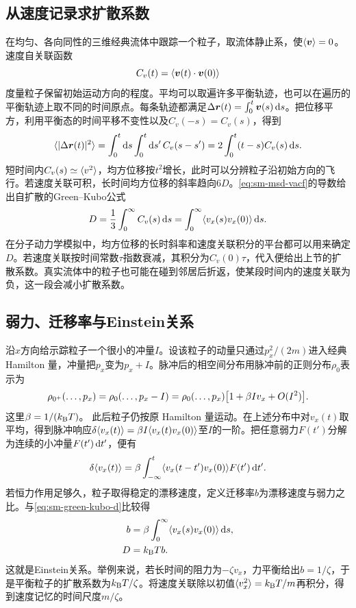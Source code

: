 \subsection{从速度记录求扩散系数}
在均匀、各向同性的三维经典流体中跟踪一个粒子，取流体静止系，使$\langle\bm v\rangle = 0$。速度自关联函数
\begin{equation}
	\label{eq:sm-velocity-autocorrelation}
	C_v(t) = \langle\bm v(t) \cdot \bm v(0)\rangle
\end{equation}
度量粒子保留初始运动方向的程度。平均可以取遍许多平衡轨迹，也可以在遍历的平衡轨迹上取不同的时间原点。每条轨迹都满足$\textstyle \Delta\bm r(t) = \int_0^t\bm v(s)\mathop{}\!\mathrm{d} s$。把位移平方，利用平衡态的时间平移不变性以及$C_v(-s) = C_v(s)$，得到
\begin{equation}
	\langle\lvert\Delta\bm r(t)\rvert^2\rangle
	= \int_0^t\mathop{}\!\mathrm{d} s\int_0^t\mathop{}\!\mathrm{d} s'\,C_v(s - s')
	= 2\int_0^t(t - s)C_v(s)\mathop{}\!\mathrm{d} s.
	\label{eq:sm-msd-vacf}
\end{equation}
短时间内$C_v(s) \simeq \langle v^2\rangle$，均方位移按$t^2$增长，此时可以分辨粒子沿初始方向的飞行。若速度关联可积，长时间均方位移的斜率趋向$6D$。\eqref{eq:sm-msd-vacf}的导数给出自扩散的Green--Kubo公式
\begin{equation}
	D = \frac13\int_0^\infty C_v(s)\mathop{}\!\mathrm{d} s
	= \int_0^\infty\langle v_x(s)v_x(0)\rangle\mathop{}\!\mathrm{d} s .
	\label{eq:sm-green-kubo-d}
\end{equation}
在分子动力学模拟中，均方位移的长时斜率和速度关联积分的平台都可以用来确定$D$。若速度关联按时间常数$\tau$指数衰减，其积分为$C_v(0)\tau$，代入便给出上节的扩散系数。真实流体中的粒子也可能在碰到邻居后折返，使某段时间内的速度关联为负，这一段会减小扩散系数。

\subsection{弱力、迁移率与Einstein关系}
沿$x$方向给示踪粒子一个很小的冲量$I$。设该粒子的动量只通过$p_x^2/(2m)$进入经典 Hamilton 量，冲量把$p_x$变为$p_x + I$。脉冲后的相空间分布用脉冲前的正则分布$\rho_0$表示为
\[
	\rho_{0^+}(\ldots,p_x) = \rho_0(\ldots,p_x - I)
	= \rho_0(\ldots,p_x)\bigl[1 + \beta I v_x + O(I^2)\bigr].
\]
这里$\beta = 1/(k_{\mathrm{B}} T)$。
此后粒子仍按原 Hamilton 量运动。在上述分布中对$v_x(t)$取平均，得到脉冲响应$\delta\langle v_x(t)\rangle = \beta I\langle v_x(t)v_x(0)\rangle$至$I$的一阶。把任意弱力$F(t')$分解为连续的小冲量$F(t')\mathop{}\!\mathrm{d} t'$，便有
\begin{equation}
	\label{eq:sm-force-velocity-response}
	\delta\langle v_x(t)\rangle
	= \beta\int_{-\infty}^{t}\langle v_x(t - t')v_x(0)\rangle F(t')\mathop{}\!\mathrm{d} t'.
\end{equation}
若恒力作用足够久，粒子取得稳定的漂移速度，定义迁移率$b$为漂移速度与弱力之比。与\eqref{eq:sm-green-kubo-d}比较得
\begin{subequations}
	\begin{align}
		b &= \beta\int_0^\infty\langle v_x(s)v_x(0)\rangle\mathop{}\!\mathrm{d} s,\\
		D &= k_{\mathrm{B}} T b . \label{eq:sm-einstein-mobility}
	\end{align}
\end{subequations}
这就是Einstein关系。举例来说，若长时间的阻力为$-\zeta v_x$，力平衡给出$b = 1/\zeta$，于是平衡粒子的扩散系数为$k_{\mathrm{B}} T/\zeta$。将速度关联除以初值$\langle v_x^2\rangle = k_{\mathrm{B}} T/m$再积分，得到速度记忆的时间尺度$m/\zeta$。

